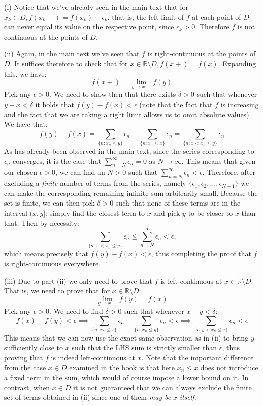 \begin{solution}

    (i) Notice that we've already seen in the main text that for $x_k \in D, f(x_k-) = f(x_k) - \epsilon_k$, that is, the left limit of $f$ at each point of $D$ can never equal its value on the respective point, since $\epsilon_k > 0$.
    Therefore $f$ is not continuous at the points of $D$.

    (ii) Again, in the main text we've seen that $f$ is right-continuous at the points of $D$.
    It suffices therefore to check that for $x \in \mathbb{R} \setminus D, f(x+) = f(x)$.
    Expanding this, we have:
    $$f(x+) = \lim_{y \rightarrow x+} f(y)$$
    Pick any $\epsilon > 0$.
    We need to show then that there exists $\delta > 0$ such that whenever $y - x < \delta$ it holds that $f(y) - f(x) < \epsilon$ (note that the fact that $f$ is increasing and the fact that we are taking a right limit allows us to omit absolute values).
    We have that:
    $$f(y) - f(x) = \sum_{\{n: x_n \leq y\}} \epsilon_n - \sum_{\{n: x_n \leq x\}} \epsilon_n = \sum_{\{n: x < x_n \leq y\}} \epsilon_n$$
    As has already been observed in the main text, since the series corresponding to $\epsilon_n$ converges, it is the case that $\sum_{n=N}^{\infty} \epsilon_n = 0$ as $N \rightarrow \infty$.
    This means that given our chosen $\epsilon > 0$, we can find an $N > 0$ such that $\sum_{n=N}^{\infty} \epsilon_n < \epsilon$.
    Therefore, after excluding a \textit{finite} number of terms from the series, namely $\{\epsilon_1, \epsilon_2, \ldots, \epsilon_{N-1}\}$ we can make the corresponding remaining infinite sum arbitrarily small.
    Because the set is finite, we can then pick $\delta > 0$ such that none of these terms are in the interval $(x, y]$: simply find the closest term to $x$ and pick $y$ to be closer to $x$ than that. 
    Then by necessity:
    $$\sum_{\{n: x < x_n \leq y\}} \epsilon_n \leq \sum_{n=N}^{\infty} \epsilon_n < \epsilon,$$
    which means precisely that $f(y) - f(x) < \epsilon$, thus completing the proof that $f$ is right-continuous everywhere.

    (iii) Due to part (ii) we only need to prove that $f$ is left-continuous at $x \in \mathbb{R} \setminus D$.
    That is, we need to prove that for $x \in \mathbb{R} \setminus D$:
    $$\lim_{y \rightarrow x-} f(y) = f(x)$$
    Pick any $\epsilon >0 $.
    We need to find $\delta > 0$ such that whenever $x - y < \delta$:
    $$f(x) - f(y) < \epsilon \implies \sum_{\{n: x_n \leq x\}} \epsilon_n - \sum_{\{n: x_n \leq y\}} \epsilon_n < \epsilon \implies \sum_{\{n : y < x_n \leq x\}} \epsilon_n < \epsilon$$
    This means that we can now use the exact same observation as in (ii) to bring $y$ sufficiently close to $x$ such that the LHS sum is strictly smaller than $\epsilon$, thus proving that $f$ is indeed left-continuous at $x$.
    Note that the important difference from the case $x \in D$ examined in the book is that here $x_n \leq x$ does not introduce a fixed term in the sum, which would of course impose a lower bound on it.
    In contrast, when $x \in D$ it is not guaranteed that we can always exclude the finite set of terms obtained in (ii) since one of them \textit{may be} $x$ \textit{itself}.


\end{solution}
